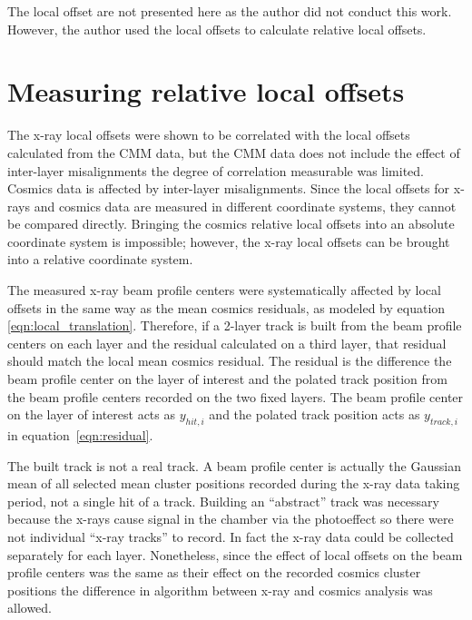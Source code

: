 The local offset are not presented here as the author did not conduct this work. However, the author used the local offsets to calculate relative local offsets.

\section{Measuring relative local offsets}

The x-ray local offsets were shown to be correlated with the local offsets calculated from the CMM data, but the CMM data does not include the effect of inter-layer misalignments the degree of correlation measurable was limited. Cosmics data is affected by inter-layer misalignments. Since the local offsets for x-rays and cosmics data are measured in different coordinate systems, they cannot be compared directly. Bringing the cosmics relative local offsets into an absolute coordinate system is impossible; however, the x-ray local offsets can be brought into a relative coordinate system.

The measured x-ray beam profile centers were systematically affected by local offsets in the same way as the mean cosmics residuals, as modeled by equation \ref{eqn:local_translation}. Therefore, if a 2-layer track is built from the beam profile centers on each layer and the residual calculated on a third layer, that residual should match the local mean cosmics residual. The residual is the difference the beam profile center on the layer of interest and the polated track position from the beam profile centers recorded on the two fixed layers. The beam profile center on the layer of interest acts as $y_{hit, i}$ and the polated track position acts as $y_{track, i}$ in equation~\ref{eqn:residual}.

The built track is not a real track. A beam profile center is actually the Gaussian mean of all selected mean cluster positions recorded during the x-ray data taking period, not a single hit of a track. Building an ``abstract'' track was necessary because the x-rays cause signal in the chamber via the photoeffect so there were not individual ``x-ray tracks'' to record. In fact the x-ray data could be collected separately for each layer. Nonetheless, since the effect of local offsets on the beam profile centers was the same as their effect on the recorded cosmics cluster positions the difference in algorithm between x-ray and cosmics analysis was allowed. 

